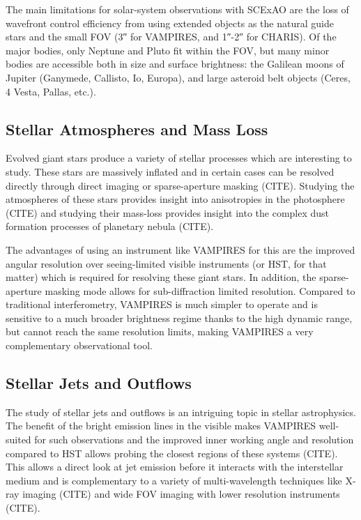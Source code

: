 The main limitations for solar-system observations with SCExAO are the loss of wavefront control efficiency from using extended objects as the natural guide stars and the small FOV (\ang{;;3} for VAMPIRES, and \ang{;;1}-\ang{;;2} for CHARIS). Of the major bodies, only Neptune and Pluto fit within the FOV, but many minor bodies are accessible both in size and surface brightness: the Galilean moons of Jupiter (Ganymede, Callisto, Io, Europa), and large asteroid belt objects (Ceres, 4 Vesta, Pallas, etc.).


\subsection{Stellar Atmospheres and Mass Loss}

Evolved giant stars produce a variety of stellar processes which are interesting to study. These stars are massively inflated and in certain cases can be resolved directly through direct imaging or sparse-aperture masking (CITE). Studying the atmospheres of these stars provides insight into anisotropies in the photosphere (CITE) and studying their mass-loss provides insight into the complex dust formation processes of planetary nebula (CITE).

The advantages of using an instrument like VAMPIRES for this are the improved angular resolution over seeing-limited visible instruments (or HST, for that matter) which is required for resolving these giant stars. In addition, the sparse-aperture masking mode allows for sub-diffraction limited resolution. Compared to traditional interferometry, VAMPIRES is much simpler to operate and is sensitive to a much broader brightness regime thanks to the high dynamic range, but cannot reach the same resolution limits, making VAMPIRES a very complementary observational tool.

\subsection{Stellar Jets and Outflows}

The study of stellar jets and outflows is an intriguing topic in stellar astrophysics. The benefit of the bright emission lines in the visible makes VAMPIRES well-suited for such observations and the improved inner working angle and resolution compared to HST allows probing the closest regions of these systems (CITE). This allows a direct look at jet emission before it interacts with the interstellar medium and is complementary to a variety of multi-wavelength techniques like X-ray imaging (CITE) and wide FOV imaging with lower resolution instruments (CITE).
